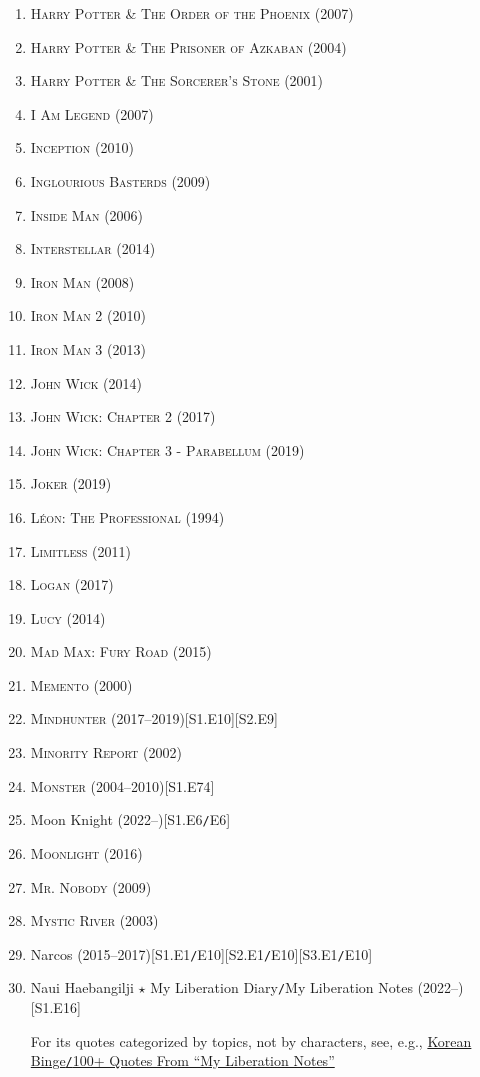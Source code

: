 \documentclass[oneside]{book}
\numberwithin{equation}{section}
\begin{document}
\begin{enumerate}
	\item \textsc{Harry Potter \& The Order of the Phoenix} (2007)
	\item \textsc{Harry Potter \& The Prisoner of Azkaban} (2004)
	\item \textsc{Harry Potter \& The Sorcerer's Stone} (2001)
	\item \textsc{I Am Legend} (2007)
	\item \textsc{Inception} (2010)
	\item \textsc{Inglourious Basterds} (2009)
	\item \textsc{Inside Man} (2006)
	\item \textsc{Interstellar} (2014)
	\item \textsc{Iron Man} (2008)
	\item \textsc{Iron Man 2} (2010)
	\item \textsc{Iron Man 3} (2013)
	\item \textsc{John Wick} (2014)
	\item \textsc{John Wick: Chapter 2} (2017)
	\item \textsc{John Wick: Chapter 3 - Parabellum} (2019)
	\item \textsc{Joker} (2019)
	\item \textsc{L\'eon: The Professional} (1994)
	\item \textsc{Limitless} (2011)
	\item \textsc{Logan} (2017)
	\item \textsc{Lucy} (2014)
	\item \textsc{Mad Max: Fury Road} (2015)
	\item \textsc{Memento} (2000)
	\item \textsc{Mindhunter} (2017--2019)\hfill[S1.E10][S2.E9]
	\item \textsc{Minority Report} (2002)
	\item \textsc{Monster} (2004--2010)\hfill[S1.E74]
	\item Moon Knight (2022--)\hfill[S1.E6\texttt{/}E6]
	\item \textsc{Moonlight} (2016)
	\item \textsc{Mr. Nobody} (2009)
	\item \textsc{Mystic River} (2003)
	\item Narcos (2015--2017)\hfill[S1.E1\texttt{/}E10][S2.E1\texttt{/}E10][S3.E1\texttt{/}E10]
	\item Naui Haebangilji $\star$ My Liberation Diary\texttt{/}My Liberation Notes (2022--)\hfill[S1.E16]
	
	For its quotes categorized by topics, not by characters, see, e.g., \href{https://korean-binge.com/2022/04/12/100-quotes-from-my-liberation-notes/}{Korean Binge\texttt{/}100+ Quotes From ``My Liberation Notes''}	
	

\end{enumerate}
\end{document}
